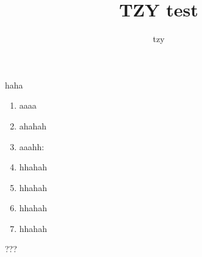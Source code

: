 \documentclass{article}
\author{tzy}
\title{TZY test}
\begin{document}
\maketitle{}
haha
\begin{enumerate}
\item aaaa
\item ahahah
\item aaahh:
\item hhahah
\item hhahah
\item hhahah
\item hhahah
\end{enumerate}
???
\end{document}
